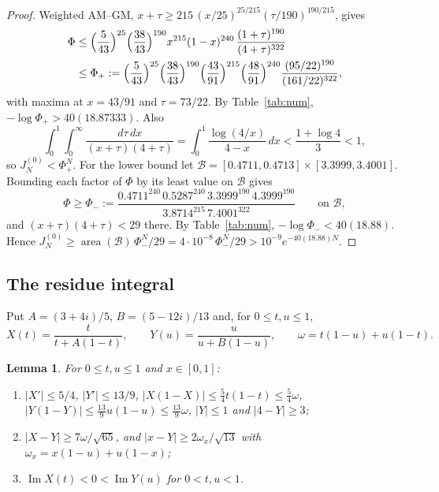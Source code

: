 \documentclass{amsart}
\newtheorem{lemma}{Lemma}[section]
\numberwithin{equation}{section}
\numberwithin{table}{section}
\begin{document}
\begin{proof}
Weighted AM--GM, $x+\tau\ge215\,(x/25)^{25/215}(\tau/190)^{190/215}$, gives
\begin{align*}
\Phi&\le\Bigl(\frac5{43}\Bigr)^{25}\Bigl(\frac{38}{43}\Bigr)^{190}
x^{215}(1-x)^{240}\,\frac{(1+\tau)^{190}}{(4+\tau)^{322}}\\
&\le\Phi_+:=\Bigl(\frac5{43}\Bigr)^{25}\Bigl(\frac{38}{43}\Bigr)^{190}
\Bigl(\frac{43}{91}\Bigr)^{215}\Bigl(\frac{48}{91}\Bigr)^{240}
\frac{(95/22)^{190}}{(161/22)^{322}},
\end{align*}
with maxima at $x=43/91$ and $\tau=73/22$. By Table~\ref{tab:num},
$-\log\Phi_+>40(18.87333)$. Also
\[
\int_0^1\!\!\int_0^\infty\frac{d\tau\,dx}{(x+\tau)(4+\tau)}=\int_0^1\frac{\log(4/x)}{4-x}\,dx
<\frac{1+\log4}{3}<1,
\]
so $J_N^{(0)}<\Phi_+^N$.
For the lower bound let $\mathcal B=[0.4711,0.4713]\times[3.3999,3.4001]$.
Bounding each factor of $\Phi$ by its least value on $\mathcal B$ gives
\[
\Phi\ge\Phi_-:=\frac{0.4711^{240}\,0.5287^{240}\,3.3999^{190}\,4.3999^{190}}
{3.8714^{215}\,7.4001^{322}}\qquad\text{on }\mathcal B,
\]
and $(x+\tau)(4+\tau)<29$ there. By Table~\ref{tab:num},
$-\log\Phi_-<40(18.88)$. Hence
$J_N^{(0)}\ge\operatorname{area}(\mathcal B)\,\Phi_-^N/29=4\cdot10^{-8}\,\Phi_-^N/29>10^{-9}e^{-40(18.88)N}$.
\end{proof}

\subsection{The residue integral}
Put $A=(3+4i)/5$, $B=(5-12i)/13$ and, for $0\le t,u\le1$,
\[
X(t)=\frac{t}{t+A(1-t)},\qquad Y(u)=\frac{u}{u+B(1-u)},\qquad
\omega=t(1-u)+u(1-t).
\]

\begin{lemma}\label{lem:arcs}
For $0\le t,u\le1$ and $x\in[0,1]$:
\begin{enumerate}
\item $|X'|\le5/4$, $|Y'|\le13/9$, $|X(1-X)|\le\frac54t(1-t)\le\frac54\omega$,
$|Y(1-Y)|\le\frac{13}9u(1-u)\le\frac{13}9\omega$, $|Y|\le1$ and $|4-Y|\ge3$;
\item $|X-Y|\ge7\omega/\sqrt{65}$, and $|x-Y|\ge2\omega_x/\sqrt{13}$ with
$\omega_x=x(1-u)+u(1-x)$;
\item $\operatorname{Im}X(t)<0<\operatorname{Im}Y(u)$ for $0<t,u<1$.
\end{enumerate}
\end{lemma}
\end{document}
